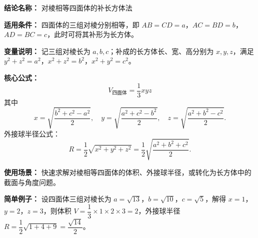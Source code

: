 \textbf{结论名称：} 对棱相等四面体的补长方体法

\textbf{适用条件：} 四面体的三组对棱分别相等，即 \(AB=CD=a\)，\(AC=BD=b\)，\(AD=BC=c\)，此时可将其补形为长方体。

\textbf{变量说明：} 记三组对棱长为 \(a,b,c\)；补成的长方体长、宽、高分别为 \(x,y,z\)，满足 \(y^{2}+z^{2}=a^{2}\)，\(x^{2}+z^{2}=b^{2}\)，\(x^{2}+y^{2}=c^{2}\)。

\textbf{核心公式：}
\[
\boxed{V_{\text{四面体}} = \frac{1}{3}xyz}
\]
其中
\[
x=\sqrt{\frac{b^{2}+c^{2}-a^{2}}{2}},\quad
y=\sqrt{\frac{a^{2}+c^{2}-b^{2}}{2}},\quad
z=\sqrt{\frac{a^{2}+b^{2}-c^{2}}{2}}.
\]
外接球半径公式：
\[
R=\frac{1}{2}\sqrt{x^{2}+y^{2}+z^{2}}=\frac{1}{2}\sqrt{\frac{a^{2}+b^{2}+c^{2}}{2}}.
\]

\textbf{使用场景：} 快速求解对棱相等四面体的体积、外接球半径，或转化为长方体中的截面与角度问题。

\textbf{简单例子：} 设四面体三组对棱长为 \(a=\sqrt{13}\)，\(b=\sqrt{10}\)，\(c=\sqrt{5}\)，解得 \(x=1\)，\(y=2\)，\(z=3\)，则体积 \(V=\dfrac{1}{3}\times 1\times 2\times 3=2\)，外接球半径 \(R=\dfrac{1}{2}\sqrt{1+4+9}=\dfrac{\sqrt{14}}{2}\)。